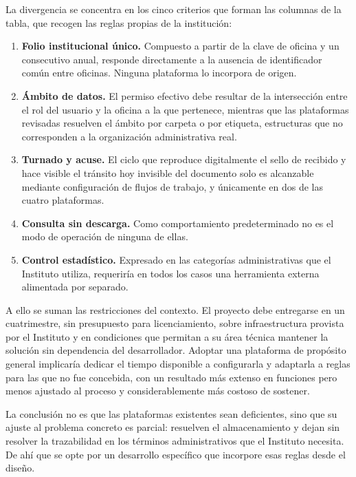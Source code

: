 La divergencia se concentra en los cinco criterios que forman las columnas de la tabla, que recogen las reglas propias de la institución:

\begin{enumerate}[nosep]
  \item \textbf{Folio institucional único.} Compuesto a partir de la clave de oficina y un consecutivo anual, responde directamente a la ausencia de identificador común entre oficinas. Ninguna plataforma lo incorpora de origen.
  \item \textbf{Ámbito de datos.} El permiso efectivo debe resultar de la intersección entre el rol del usuario y la oficina a la que pertenece, mientras que las plataformas revisadas resuelven el ámbito por carpeta o por etiqueta, estructuras que no corresponden a la organización administrativa real.
  \item \textbf{Turnado y acuse.} El ciclo que reproduce digitalmente el sello de recibido y hace visible el tránsito hoy invisible del documento solo es alcanzable mediante configuración de flujos de trabajo, y únicamente en dos de las cuatro plataformas.
  \item \textbf{Consulta sin descarga.} Como comportamiento predeterminado no es el modo de operación de ninguna de ellas.
  \item \textbf{Control estadístico.} Expresado en las categorías administrativas que el Instituto utiliza, requeriría en todos los casos una herramienta externa alimentada por separado.
\end{enumerate}

A ello se suman las restricciones del contexto. El proyecto debe entregarse en un cuatrimestre, sin presupuesto para licenciamiento, sobre infraestructura provista por el Instituto y en condiciones que permitan a su área técnica mantener la solución sin dependencia del desarrollador. Adoptar una plataforma de propósito general implicaría dedicar el tiempo disponible a configurarla y adaptarla a reglas para las que no fue concebida, con un resultado más extenso en funciones pero menos ajustado al proceso y considerablemente más costoso de sostener.

La conclusión no es que las plataformas existentes sean deficientes, sino que su ajuste al problema concreto es parcial: resuelven el almacenamiento y dejan sin resolver la trazabilidad en los términos administrativos que el Instituto necesita. De ahí que se opte por un desarrollo específico que incorpore esas reglas desde el diseño.

